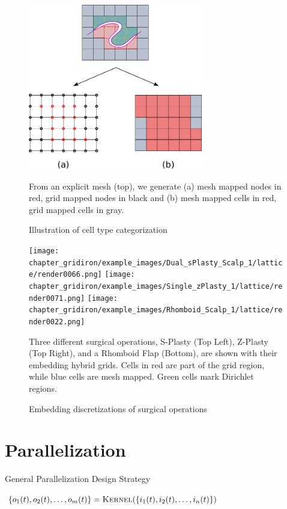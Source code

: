 \begin{figure}
  \centering
\vspace*{-.12in}
  \includegraphics[width=3in]{chapter_gridiron/images/Figure_Topology_D}
\vspace*{-.07in}
  \caption{Illustration of cell type categorization}{From an explicit mesh (top), we generate (a) mesh mapped nodes in red, grid mapped nodes in black and (b) mesh mapped cells in red, grid mapped cells in gray.}
  \label{fig:remapping}
\end{figure}

\begin{figure}
  \centering
  \texttt{[image: chapter\_gridiron/example\_images/Dual\_sPlasty\_Scalp\_1/lattice/render0066.png]}
  \texttt{[image: chapter\_gridiron/example\_images/Single\_zPlasty\_1/lattice/render0071.png]}
  \texttt{[image: chapter\_gridiron/example\_images/Rhomboid\_Scalp\_1/lattice/render0022.png]}
  \caption{Embedding discretizations of surgical operations}{Three
    different surgical operations, S-Plasty (Top Left), Z-Plasty (Top
    Right), and a Rhomboid Flap (Bottom), are shown with their
    embedding hybrid grids. Cells in red are part of the grid region, while
    blue cells are mesh mapped. Green cells mark Dirichlet regions.}
  \label{fig:surgicalembeddings}
\end{figure}

\section{Parallelization}

\begin{algorithm}
  \caption{General Parallelization Design Strategy}
  \label{alg:GeneralStrategy}
  \begin{algorithmic}[1]


    \State $\{ o_1(t), o_2(t),\ldots, o_m(t) \} = \Call{Kernel}{\{ i_1(t), i_2(t),\ldots, i_n(t) \}}$
    
    \EndFor
    
  \end{algorithmic}
  
\end{algorithm}


